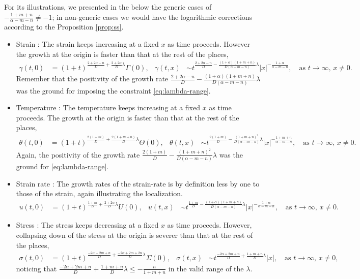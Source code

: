 \documentclass[a4paper,11pt]{article}
\begin{document}
For its illustrations, we presented in the below the generic cases of $-\frac{1+m+n}{\alpha-m-n}\ne-1$; in non-generic cases we would have the logarithmic corrections according to the Proposition \ref{prop:ss}.
\begin{itemize}
 \item Strain : The strain keeps increasing at a fixed $x$ as time proceeds. However the growth at the origin is faster than that at the rest of the places,
\begin{align*}
 \gamma(t,0) &= (1+t)^{\frac{2+2\alpha-n}{D} + \frac{2+2\alpha}{D}\lambda}\Gamma(0), &
 \gamma(t,x) &\sim t^{\frac{2+2\alpha-n}{D} - \frac{(1+\alpha)(1+m+n)}{D(\alpha-m-n)}\lambda}|x|^{-\frac{1+\alpha}{\alpha-m-n}}, \quad \text{as $t \rightarrow \infty$, $x\ne0$.}
\end{align*}
Remember that the positivity of the growth rate $\frac{2+2\alpha-n}{D} - \frac{(1+\alpha)(1+m+n)}{D(\alpha-m-n)}\lambda$ was the ground for imposing the constraint \eqref{eq:lambda-range}.
\item Temperature : The temperature keeps increasing at a fixed $x$ as time proceeds. The growth at the origin is faster than that at the rest of the places,
\begin{align*}
 \theta(t,0) &= (1+t)^{\frac{2(1+m)}{D} + \frac{2(1+m+n)}{D}\lambda}\Theta(0),&
 \theta(t,x) &\sim t^{\frac{2(1+m)}{D} - \frac{(1+m+n)^2}{D(\alpha-m-n)}\lambda}|x|^{-\frac{1+m+n}{\alpha-m-n}}, \quad \text{as $t \rightarrow \infty$, $x\ne0$.}
\end{align*}
Again, the positivity of the growth rate $\frac{2(1+m)}{D} - \frac{(1+m+n)^2}{D(\alpha-m-n)}\lambda$ was the ground for \eqref{eq:lambda-range}.
\item Strain rate : The growth rates of the strain-rate is by definition less by one to those of the strain, again illustrating the localization.
\begin{align*}
 u(t,0) &= (1+t)^{\frac{1+m}{D} + \frac{2+2\alpha}{D}\lambda}U(0),&
 u(t,x) &\sim t^{\frac{1+m}{D} - \frac{(1+\alpha)(1+m+n)}{D(\alpha-m-n)}\lambda}|x|^{-\frac{1+\alpha}{\alpha-m-n}}, \quad \text{as $t \rightarrow \infty$, $x\ne0$.}
\end{align*}
\item Stress : The stress keeps decreasing at a fixed $x$ as time proceeds. However, collapsing down of the stress at the origin is severer than that at the rest of the places,
\begin{align*}
 \sigma(t,0) &= (1+t)^{\frac{-2\alpha+2m+n}{D} + \frac{-2\alpha+2m+2n}{D}\lambda}\Sigma(0), &
 \sigma(t,x) &\sim t^{\frac{-2\alpha+2m+n}{D} +\frac{1+m+n}{D}\lambda}|x|, \quad \text{as $t \rightarrow \infty$, $x\ne0$,}
\end{align*}
noticing that $\frac{-2\alpha+2m+n}{D} +\frac{1+m+n}{D}\lambda\le-\frac{n}{1+m+n}$ in the valid range of the $\lambda$.



\end{itemize}
\end{document}
